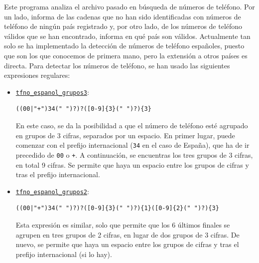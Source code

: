 \documentclass[12pt]{article}
\begin{document}
    Este programa analiza el archivo pasado en búsqueda de números de teléfono. Por un lado, informa de las cadenas que no han sido identificadas con números de teléfono de ningún país registrado y, por otro lado, de los números de teléfono válidos que se han encontrado, informa en qué país son válidos. Actualmente tan solo se ha implementado la detección de números de teléfono españoles, puesto que son los que conocemos de primera mano, pero la extensión a otros países es directa.
    Para detectar los números de teléfono, se han usado las siguientes expresiones regulares:
    \begin{itemize}
        \item \ul{\texttt{tfno\_espanol\_grupos3}}:
        \begin{lstlisting}
((00|"+")34(" ")?)?([0-9]{3}(" ")?){3}
        \end{lstlisting}
        
        En este caso, se da la posibilidad a que el número de teléfono esté agrupado en grupos de 3 cifras, separados por un espacio. En primer lugar, puede comenzar con el prefijo internacional (\verb|34| en el caso de España), que ha de ir precedido de \verb|00| o \verb|+|. A continuación, se encuentras los tres grupos de 3 cifras, en total 9 cifras. Se permite que haya un espacio entre los grupos de cifras y tras el prefijo internacional.

        \item \ul{\texttt{tfno\_espanol\_grupos2}}:
        \begin{lstlisting}
((00|"+")34(" ")?)?([0-9]{3}(" ")?){1}([0-9]{2}(" ")?){3}
        \end{lstlisting}
        
        Esta expresión es similar, solo que permite que los 6 últimos finales se agrupen en tres grupos de 2 cifras, en lugar de dos grupos de 3 cifras. De nuevo, se permite que haya un espacio entre los grupos de cifras y tras el prefijo internacional (si lo hay).
    \end{itemize}
\end{document}
